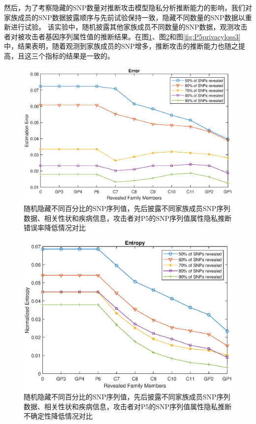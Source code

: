 然后，为了考察隐藏的SNP数量对推断攻击模型隐私分析推断能力的影响，我们对家族成员的SNP数据披露顺序与先前试验保持一致，隐藏不同数量的SNP数据以重新进行试验。 该实验中，随机披露其他家族成员不同数量的SNP数据，观测攻击者对被攻击者基因序列属性值的推断结果。在图\ref{fig:P5error3}、图\ref{fig:P5entropy3}和图\ref{fig:P5privacyloss3}中，结果表明，随着观测到家族成员的SNP增多，推断攻击的推断能力也随之提高，且这三个指标的结果是一致的。

\begin{figure}[htbp]
	\centering
	\includegraphics[width=0.8\linewidth]{./figures/P5error3.eps}
	\centering
	\caption{随机隐藏不同百分比的SNP序列值，先后披露不同家族成员SNP序列数据、相关性状和疾病信息，攻击者对P5的SNP序列值属性隐私推断错误率降低情况对比}\label{fig:P5error3}
\end{figure}


\begin{figure}[htbp]
	\centering
	\includegraphics[width=0.8\linewidth]{./figures/P5entropy3.eps}
	\centering
	\caption{随机隐藏不同百分比的SNP序列值，先后披露不同家族成员SNP序列数据、相关性状和疾病信息，攻击者对P5的SNP序列值属性隐私推断不确定性降低情况对比}\label{fig:P5entropy3}
\end{figure}

